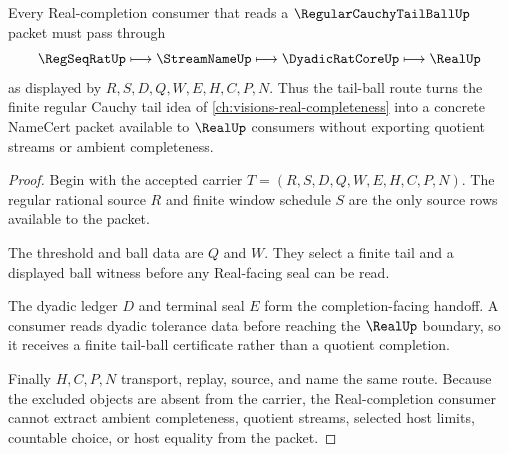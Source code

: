 \begin{theorem}
\label{thm:regular-cauchy-tail-ball-real-completion-route}
Every Real-completion consumer that reads a $\RegularCauchyTailBallUp$ packet must pass through
$$
\RegSeqRatUp \longmapsto \StreamNameUp \longmapsto \DyadicRatCoreUp \longmapsto \RealUp
$$
as displayed by $R,S,D,Q,W,E,H,C,P,N$. Thus the tail-ball route turns the finite regular Cauchy tail idea of \autoref{ch:visions-real-completeness} into a concrete NameCert packet available to $\RealUp$ consumers without exporting quotient streams or ambient completeness.
\end{theorem}
\begin{proof}
Begin with the accepted carrier $T=(R,S,D,Q,W,E,H,C,P,N)$. The regular rational source $R$ and finite window schedule $S$ are the only source rows available to the packet.

The threshold and ball data are $Q$ and $W$. They select a finite tail and a displayed ball witness before any Real-facing seal can be read.

The dyadic ledger $D$ and terminal seal $E$ form the completion-facing handoff. A consumer reads dyadic tolerance data before reaching the $\RealUp$ boundary, so it receives a finite tail-ball certificate rather than a quotient completion.

Finally $H,C,P,N$ transport, replay, source, and name the same route. Because the excluded objects are absent from the carrier, the Real-completion consumer cannot extract ambient completeness, quotient streams, selected host limits, countable choice, or host equality from the packet.
\end{proof}




